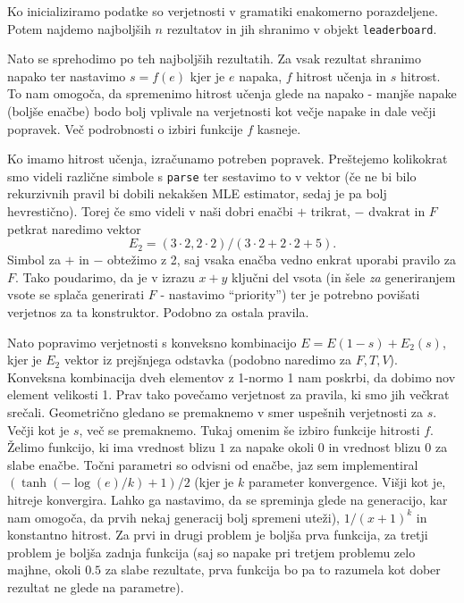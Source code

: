 \documentclass{article}
\begin{document}
Ko inicializiramo podatke so verjetnosti v gramatiki enakomerno porazdeljene. Potem najdemo najboljših \(n\) rezultatov in jih shranimo v objekt \texttt{leaderboard}. 

Nato se sprehodimo po teh najboljših rezultatih. Za vsak rezultat shranimo napako ter nastavimo \(s=f(e)\) kjer je \(e\) napaka, \(f\) hitrost učenja in \(s\) hitrost. To nam omogoča, da spremenimo hitrost učenja glede na napako - manjše napake (boljše enačbe) bodo bolj vplivale na verjetnosti kot večje napake in dale večji popravek. Več podrobnosti o izbiri funkcije \(f\) kasneje. 

Ko imamo hitrost učenja, izračunamo potreben popravek. Preštejemo kolikokrat smo videli različne simbole s \texttt{parse} ter sestavimo to v vektor  (če ne bi bilo rekurzivnih pravil bi dobili nekakšen MLE estimator, sedaj je pa bolj hevrestično). Torej če smo videli v naši dobri enačbi \(+\) trikrat, \(-\) dvakrat in \(F\) petkrat naredimo vektor 
\[
    E_2=(3\cdot 2, 2\cdot2)/(3\cdot 2+2\cdot 2 + 5).
\]
Simbol za \(+\) in \(-\) obtežimo z 2, saj vsaka enačba vedno enkrat uporabi pravilo za \(F\). Tako poudarimo, da je v izrazu \(x+y\) ključni del vsota (in šele \emph{za} generiranjem vsote se splača generirati \(F\) - nastavimo ``priority'') ter je potrebno povišati verjetnos za ta konstruktor. Podobno za ostala pravila.

Nato popravimo verjetnosti s konveksno kombinacijo \(E = E(1-s) + E_2(s)\), kjer je \(E_2\) vektor iz prejšnjega odstavka (podobno naredimo za \(F,T,V\)). Konveksna kombinacija dveh elementov z 1-normo 1 nam poskrbi, da dobimo nov element velikosti 1. Prav tako povečamo verjetnost za pravila, ki smo jih večkrat srečali. Geometrično gledano se premaknemo v smer uspešnih verjetnosti za \(s\). Večji kot je \(s\), več se premaknemo. Tukaj omenim še izbiro funkcije hitrosti \(f\). Želimo funkcijo, ki ima vrednost blizu \(1\) za napake okoli \(0\) in vrednost blizu \(0\) za slabe enačbe. Točni parametri so odvisni od enačbe, jaz sem implementiral \((\tanh(-\log(e)/k)+1)/2\) (kjer je \(k\) parameter konvergence. Višji kot je, hitreje konvergira. Lahko ga nastavimo, da se spreminja glede na generacijo, kar nam omogoča, da prvih nekaj generacij bolj spremeni uteži), \(1/(x+1)^k\) in konstantno hitrost. Za prvi in drugi problem je boljša prva funkcija, za tretji problem je boljša zadnja funkcija (saj so napake pri tretjem problemu zelo majhne, okoli \(0.5\) za slabe rezultate, prva funkcija bo pa to razumela kot dober rezultat ne glede na parametre).
\end{document}
